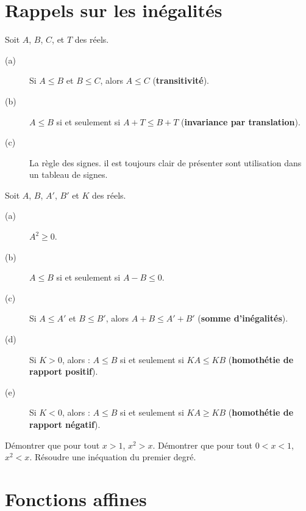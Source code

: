\documentclass[a4paper,11pt,DIV18,BCOR0mm]{scrartcl}
\begin{document}
\section{Rappels sur les inégalités}

\begin{axiome} Soit $A$, $B$, $C$, et $T$ des réels.
 \begin{description}
  \item [(a)] Si $A\leq B$ et $B\leq C$, alors $A\leq C$ (\textbf{transitivité}).
  \item [(b)]\label{item:translation} $A\leq B$ si et seulement si $A+T\leq B+T$ (\textbf{invariance par translation}).
  \item [(c)] La règle des signes. il est toujours clair de présenter sont utilisation dans un tableau de signes.
 \end{description}
\end{axiome}

\begin{theoreme} Soit $A$, $B$, $A'$, $B'$ et $K$ des réels.
\begin{description}
  \item [(a)] $A^2\geq 0$.
  \item [(b)] $A\leq B$ si et seulement si $A-B\leq 0$.
  \item [(c)] Si $A\leq A'$ et $B\leq B'$, alors $A+B\leq A'+B'$ (\textbf{somme d'inégalités}).
  \item [(d)] Si $K>0$, alors  : $A\leq B$  si et seulement si $KA\leq KB$ (\textbf{homothétie de rapport positif}).
  \item [(e)]Si $K<0$, alors  : $A\leq B$  si et seulement si $KA\geq KB$ (\textbf{homothétie de rapport négatif}).
\end{description}
\end{theoreme}

\begin{exemple}
 Démontrer que pour tout $x>1$, $x^2>x$. Démontrer que pour tout $0<x<1$, $x^2<x$. 
Résoudre une inéquation du premier degré.
\end{exemple}


\section{Fonctions affines}
\end{document}
